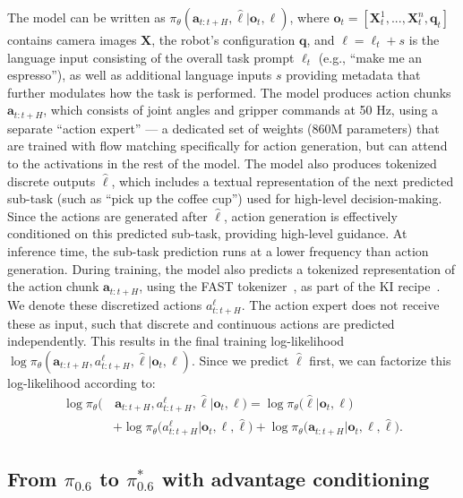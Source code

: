 \documentclass[conference]{IEEEtran}
\newcommand{\ba}{\mathbf{a}}
\newcommand{\bo}{\mathbf{o}}
\newcommand{\bq}{\mathbf{q}}
\newcommand{\bX}{\mathbf{X}}
\newcommand{\lang}{\ell}
\newcommand{\rawtext}{\hat{\ell}} %
\def \Pizs {$\pi_{0.6}$}
\def \ModelSymbol {$\pi^{*}_{0.6}$}
\begin{document}
The model can be written as $\pi_\theta(\ba_{t:t+H}, \rawtext \vert \bo_t, \lang)$, where $\bo_t = [\bX^1_t, ..., \bX^n_t, \bq_t]$
contains camera images $\bX$, the robot's configuration $\bq$, and $\lang = \lang_t + s$ is the language input consisting of the overall task prompt $\lang_t$ (e.g., ``make me an espresso''), as well as additional language inputs $s$ providing metadata that further modulates how the task is performed. 
The model produces action chunks $\ba_{t:t+H}$, which consists of joint angles and gripper commands at 50 Hz, using a separate ``action expert'' --- a dedicated set of weights (860M parameters) that are trained with flow matching specifically for action generation, but can attend to the activations in the rest of the model. The model also produces tokenized discrete outputs $\rawtext$, which includes a textual representation of the next predicted sub-task (such as ``pick up the coffee cup'') used for high-level decision-making. Since the actions are generated after $\rawtext$, action generation is effectively conditioned on this predicted sub-task, providing high-level guidance. At inference time, the sub-task prediction runs at a lower frequency than action generation. During training, the model also predicts a tokenized representation of the action chunk $\ba_{t:t+H}$, using the FAST tokenizer~\citep{pertsch2025fast}, as part of the KI recipe~\citep{driess2025knowledge}. We denote these discretized actions $a^{\ell}_{t:t+H}$. The action expert does not receive these as input, such that discrete and continuous actions are predicted independently. This results in the final training log-likelihood $\log \pi_\theta(\ba_{t:t+H}, a^{\ell}_{t:t+H}, \rawtext \vert \bo_t, \lang)$. Since we predict $\rawtext$ first, we can factorize this log-likelihood according to:
\begin{align*}
\log \pi_\theta\big(&\,\ba_{t:t+H}, a^{\ell}_{t:t+H}, \rawtext \vert \bo_t, \lang\big) = 
\log \pi_\theta\big(\rawtext \vert \bo_t, \lang\big) \\
& + \log \pi_\theta\big(a^{\ell}_{t:t+H} \vert \bo_t, \lang, \rawtext\big) + \log \pi_\theta\big(\ba_{t:t+H} \vert \bo_t, \lang, \rawtext\big).
\end{align*}




\subsection{From \Pizs{} to \ModelSymbol{} with advantage conditioning}
\end{document}
